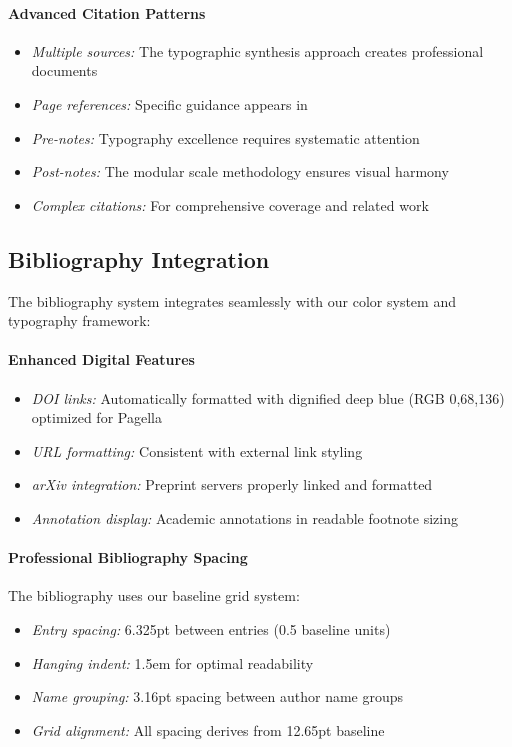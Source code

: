 \documentclass[11pt]{article}
\begin{document}
\paragraph{Advanced Citation Patterns}
\begin{itemize}
\item \emph{Multiple sources:} The typographic synthesis approach \parencite{butterick2019practical,brown2018flexible,hochuli1987detail} creates professional documents
\item \emph{Page references:} Specific guidance appears in \textcite{butterick2019practical}
\item \emph{Pre-notes:} Typography excellence requires systematic attention \parencite{hochuli1987detail}
\item \emph{Post-notes:} The modular scale methodology \parencite{brown2018flexible} ensures visual harmony
\item \emph{Complex citations:} For comprehensive coverage \parencite{butterick2019practical} and related work \parencite{bringhurst2012elements}
\end{itemize}

\subsection{Bibliography Integration}

The bibliography system integrates seamlessly with our color system and typography framework:

\paragraph{Enhanced Digital Features}
\begin{itemize}
\item \emph{DOI links:} Automatically formatted with dignified deep blue (RGB 0,68,136) optimized for Pagella
\item \emph{URL formatting:} Consistent with external link styling
\item \emph{arXiv integration:} Preprint servers properly linked and formatted
\item \emph{Annotation display:} Academic annotations in readable footnote sizing
\end{itemize}

\paragraph{Professional Bibliography Spacing}
The bibliography uses our baseline grid system:
\begin{itemize}
\item \emph{Entry spacing:} 6.325pt between entries (0.5 baseline units)
\item \emph{Hanging indent:} 1.5em for optimal readability
\item \emph{Name grouping:} 3.16pt spacing between author name groups
\item \emph{Grid alignment:} All spacing derives from 12.65pt baseline
\end{itemize}
\end{document}
